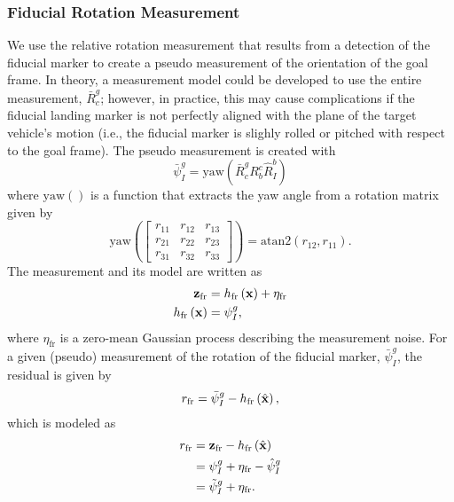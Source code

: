 \subsubsection{Fiducial Rotation Measurement}
We use the relative rotation measurement that results from a detection of the
fiducial marker
to create a pseudo measurement of the orientation of the goal frame. In theory,
a measurement model could be developed to use the entire measurement,
$\bar{R}_c^g$; however, in practice, this may cause complications if the
fiducial landing marker is not perfectly aligned with the plane of the target
vehicle's motion (i.e., the fiducial marker is slighly rolled or pitched with
respect to the goal frame).
The pseudo
measurement is created with
\begin{equation}
  \bar{\psi}_I^g = \text{yaw} \left( \bar{R}_c^g R_b^c \hat{R}_I^b \right)
\end{equation}
where $\text{yaw}\left(\right)$ is a function that extracts the yaw angle
from a rotation matrix
given by
\begin{equation}
  \text{yaw} \left(
    \begin{bmatrix}
      r_{11} & r_{12} & r_{13} \\
      r_{21} & r_{22} & r_{23} \\
      r_{31} & r_{32} & r_{33} 
    \end{bmatrix}
  \right)
  =
  \mathrm{atan2}\left( r_{12}, r_{11} \right).
\end{equation}
The measurement and its model are
written as
\begin{align}
  \boldsymbol{\mathrm{z}}_{\text{fr}} &= h_{\text{fr}} \left( \boldsymbol{\mathrm{x}} \right) + \eta_{\text{fr}} \\
  h_{\text{fr}} \left( \boldsymbol{\mathrm{x}} \right) &= \psi_I^g,
\end{align}
where $\eta_{\text{fr}}$ is a zero-mean Gaussian process describing the
measurement noise.
For a given (pseudo) measurement of the rotation of the fiducial marker,
$\bar{\psi}_I^g$,
the residual is given by
\begin{equation}
  r_{\text{fr}} = \bar{\psi}_I^g - h_{\text{fr}} \left( \hat{\boldsymbol{\mathrm{x}}} \right),
\end{equation}
which is modeled as
\begin{align}
  r_{\text{fr}} &= \boldsymbol{\mathrm{z}}_{\text{fr}} - h_{\text{fr}} \left( \hat{\boldsymbol{\mathrm{x}}} \right) \\
                &= \psi_I^g + \eta_{\text{fr}} - \hat{\psi}_I^g \\
                &= \tilde{\psi}_I^g + \eta_{\text{fr}}.
\end{align}
